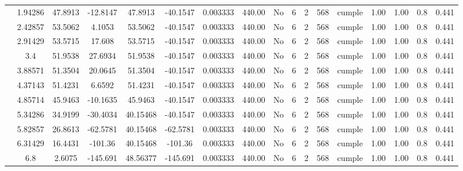 \begin{table}[H]
{\begin{tabular}{|c|c|c|c|c|c|c|c|c|c|c|c|c|c|c|c|c|}
\cline{2-17}    & 1.94286 & 47.8913 & -12.8147 & 47.8913 & -40.1547 & 0.003333 & 440.00 & No  & 6   & 2   & 568 & \cellcolor[rgb]{ .776,  .937,  .808}cumple & 1.00 & 1.00 & 0.8 & 0.441 \bigstrut\\
\cline{2-17}    & 2.42857 & 53.5062 & 4.1053 & 53.5062 & -40.1547 & 0.003333 & 440.00 & No  & 6   & 2   & 568 & \cellcolor[rgb]{ .776,  .937,  .808}cumple & 1.00 & 1.00 & 0.8 & 0.441 \bigstrut\\
\cline{2-17}    & 2.91429 & 53.5715 & 17.608 & 53.5715 & -40.1547 & 0.003333 & 440.00 & No  & 6   & 2   & 568 & \cellcolor[rgb]{ .776,  .937,  .808}cumple & 1.00 & 1.00 & 0.8 & 0.441 \bigstrut\\
\cline{2-17}    & 3.4 & 51.9538 & 27.6934 & 51.9538 & -40.1547 & 0.003333 & 440.00 & No  & 6   & 2   & 568 & \cellcolor[rgb]{ .776,  .937,  .808}cumple & 1.00 & 1.00 & 0.8 & 0.441 \bigstrut\\
\cline{2-17}    & 3.88571 & 51.3504 & 20.0645 & 51.3504 & -40.1547 & 0.003333 & 440.00 & No  & 6   & 2   & 568 & \cellcolor[rgb]{ .776,  .937,  .808}cumple & 1.00 & 1.00 & 0.8 & 0.441 \bigstrut\\
\cline{2-17}    & 4.37143 & 51.4231 & 6.6592 & 51.4231 & -40.1547 & 0.003333 & 440.00 & No  & 6   & 2   & 568 & \cellcolor[rgb]{ .776,  .937,  .808}cumple & 1.00 & 1.00 & 0.8 & 0.441 \bigstrut\\
\cline{2-17}    & 4.85714 & 45.9463 & -10.1635 & 45.9463 & -40.1547 & 0.003333 & 440.00 & No  & 6   & 2   & 568 & \cellcolor[rgb]{ .776,  .937,  .808}cumple & 1.00 & 1.00 & 0.8 & 0.441 \bigstrut\\
\cline{2-17}    & 5.34286 & 34.9199 & -30.4034 & 40.15468 & -40.1547 & 0.003333 & 440.00 & No  & 6   & 2   & 568 & \cellcolor[rgb]{ .776,  .937,  .808}cumple & 1.00 & 1.00 & 0.8 & 0.441 \bigstrut\\
\cline{2-17}    & 5.82857 & 26.8613 & -62.5781 & 40.15468 & -62.5781 & 0.003333 & 440.00 & No  & 6   & 2   & 568 & \cellcolor[rgb]{ .776,  .937,  .808}cumple & 1.00 & 1.00 & 0.8 & 0.441 \bigstrut\\
\cline{2-17}    & 6.31429 & 16.4431 & -101.36 & 40.15468 & -101.36 & 0.003333 & 440.00 & No  & 6   & 2   & 568 & \cellcolor[rgb]{ .776,  .937,  .808}cumple & 1.00 & 1.00 & 0.8 & 0.441 \bigstrut\\
\cline{2-17}    & \cellcolor[rgb]{ .851,  .882,  .949}6.8 & 2.6075 & -145.691 & 48.56377 & -145.691 & 0.003333 & 440.00 & No  & 6   & 2   & 568 & \cellcolor[rgb]{ .776,  .937,  .808}cumple & 1.00 & 1.00 & 0.8 & 0.441 \bigstrut\\

\end{tabular}}
\end{table}
